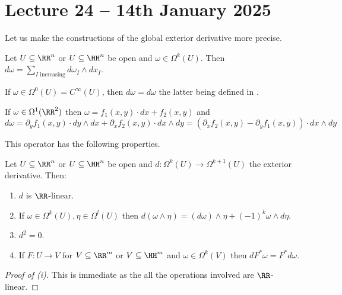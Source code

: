 \section{Lecture 24 -- 14th January 2025}\label{sec: lecture 24}
Let us make the constructions of the global exterior derivative more precise. 
\begin{definition}\label{def: Euclidean exterior derivative}
    Let $U\subseteq\RR^{n}$ or $U\subseteq\HH^{n}$ be open and $\omega\in\Omega^{k}(U)$. Then $d\omega=\sum_{I\text{ increasing}}d\omega_{I}\wedge dx_{I}$. 
\end{definition}
\begin{example}
    If $\omega\in\Omega^{0}(U)=C^{\infty}(U)$, then $d\omega=d\omega$ the latter being defined in . 
\end{example}
\begin{example}
    If $\omega\in\Omega^{1}(\RR^{2})$ then $\omega=f_{1}(x,y)\cdot dx+f_{2}(x,y)$ and $$d\omega=\partial_{y}f_{1}(x,y)\cdot dy\wedge dx+\partial_{x}f_{2}(x,y)\cdot dx\wedge dy=\left(\partial_{x}f_{2}(x,y)-\partial_{y}f_{1}(x,y)\right)\cdot dx\wedge dy$$
\end{example}
This operator has the following properties. 
\begin{proposition}\label{prop: properties of exterior derivative Euclidean}
    Let $U\subseteq\RR^{n}$ or $U\subseteq\HH^{n}$ be open and $d:\Omega^{k}(U)\to\Omega^{k+1}(U)$ the exterior derivative. Then:
    \begin{enumerate}[label=(\roman*)]
        \item $d$ is $\RR$-linear. 
        \item If $\omega\in\Omega^{k}(U),\eta\in\Omega^{l}(U)$ then $d(\omega\wedge\eta)=(d\omega)\wedge \eta+(-1)^{k}\omega\wedge d\eta$. 
        \item $d^{2}=0$. 
        \item If $F:U\to V$ for $V\subseteq\RR^{m}$ or $V\subseteq\HH^{m}$ and $\omega\in\Omega^{k}(V)$ then $dF^{*}\omega=F^{*}d\omega$. 
    \end{enumerate}
\end{proposition}
\begin{proof}[Proof of (i)]
    This is immediate as the all the operations involved are $\RR$-linear. 
\end{proof}
